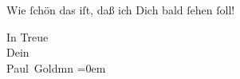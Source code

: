 \pstart
           Wie{ }ſchön das iſt, daß ich Dich bald{ }ſehen{ }ſoll!\pend
           
\pstart
           In Treue {\\[\baselineskip]}Dein {\\[\baselineskip]}\spacefill\mbox{Paul Goldmn}\pend
           \leftskip=0em{}\endnumbering{}  \newcommand{\dateiname}{L02783}\newcommand{\titel}{Paul Goldmann an Arthur Schnitzler, 26. 7. [1896]}\newcommand{\editorInnen}{Martin Anton Müller und Laura Untner}
